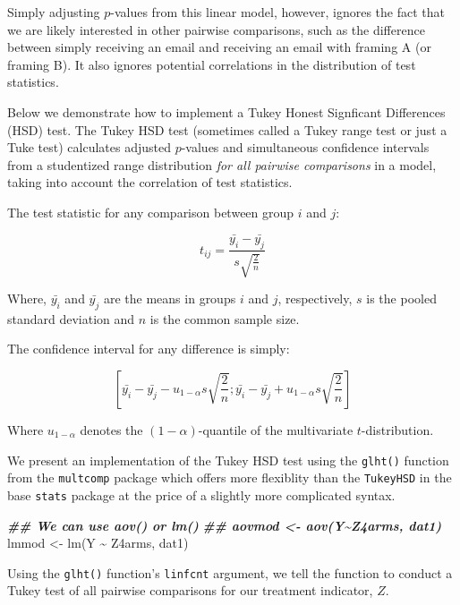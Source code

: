 \documentclass[
  12pt,
]{book}
\newenvironment{Shaded}{\begin{snugshade}}{\end{snugshade}}
\newcommand{\DocumentationTok}[1]{\textcolor[rgb]{0.56,0.35,0.01}{\textbf{\textit{#1}}}}
\newcommand{\FunctionTok}[1]{\textcolor[rgb]{0.00,0.00,0.00}{#1}}
\newcommand{\NormalTok}[1]{#1}
\newcommand{\OtherTok}[1]{\textcolor[rgb]{0.56,0.35,0.01}{#1}}
\newcommand{\SpecialCharTok}[1]{\textcolor[rgb]{0.00,0.00,0.00}{#1}}
\theoremstyle{definition}
\theoremstyle{definition}
\theoremstyle{definition}
\theoremstyle{remark}
\begin{document}
Simply adjusting \(p\)-values from this linear model, however, ignores
the fact that we are likely interested in other pairwise comparisons,
such as the difference between simply receiving an email and receiving
an email with framing A (or framing B). It also ignores potential
correlations in the distribution of test statistics.

Below we demonstrate how to implement a Tukey Honest Signficant
Differences (HSD) test. The Tukey HSD test (sometimes called a Tukey
range test or just a Tuke test) calculates adjusted \(p\)-values and
simultaneous confidence intervals from a studentized range distribution
\emph{for all pairwise comparisons} in a model, taking into account the
correlation of test statistics.

The test statistic for any comparison between group \(i\) and \(j\):

\[ t_{ij} = \frac{\bar{y_i}-\bar{y_j}}{s\sqrt{\frac{2}{n}}} \]

Where, \(\bar{y_i}\) and \(\bar{y_j}\) are the means in groups \(i\) and
\(j\), respectively, \(s\) is the pooled standard deviation and \(n\) is
the common sample size.

The confidence interval for any difference is simply:

\[ \left[
     \bar{y_i}-\bar{y_j}-u_{1-\alpha}s\sqrt{\frac{2}{n}};\bar{y_i}-\bar{y_j}+u_{1-\alpha}s\sqrt{\frac{2}{n}}\right]
\]

Where \(u_{1-\alpha}\) denotes the \((1-\alpha)\)-quantile of the
multivariate \(t\)-distribution.

We present an implementation of the Tukey HSD test using the
\texttt{glht()} function from the \texttt{multcomp} package which offers
more flexiblity than the \texttt{TukeyHSD} in the base \texttt{stats}
package at the price of a slightly more complicated syntax.

\begin{Shaded}
\begin{Highlighting}[]
\DocumentationTok{\#\# We can use aov() or lm()}
\DocumentationTok{\#\# aovmod \textless{}{-} aov(Y\textasciitilde{}Z4arms, dat1)}
\NormalTok{lmmod }\OtherTok{\textless{}{-}} \FunctionTok{lm}\NormalTok{(Y }\SpecialCharTok{\textasciitilde{}}\NormalTok{ Z4arms, dat1)}
\end{Highlighting}
\end{Shaded}

Using the \texttt{glht()} function's \texttt{linfcnt} argument, we tell
the function to conduct a Tukey test of all pairwise comparisons for our
treatment indicator, \(Z\).
\end{document}

